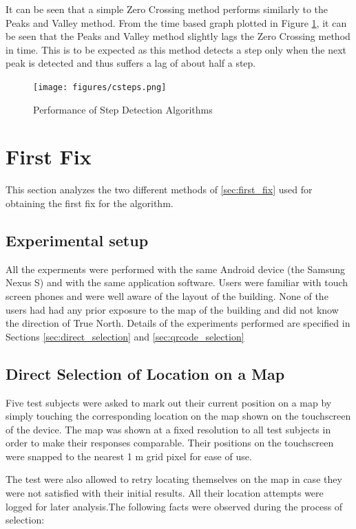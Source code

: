 It can be seen that a simple Zero Crossing method performs similarly to the 
Peaks and Valley method. From the time based graph plotted in 
Figure \ref{fig:csteps}, it can be seen that the Peaks and Valley method 
slightly lags the Zero Crossing method in time. This is to be expected as this
method detects a step only when the next peak is detected and thus suffers a 
lag of about half a step.

\begin{figure}[tbph]
    \centering
    \texttt{[image: figures/csteps.png]}
    \caption{Performance of Step Detection Algorithms\label{fig:csteps}}
\end{figure}


\section{First Fix}

This section analyzes the two different methods of \ref{sec:first_fix}
used for obtaining the first fix for the algorithm. 

\subsection{Experimental setup}

All the experments were performed with the same Android device (the Samsung 
Nexus S) and with the same application software. Users were familiar with 
touch screen phones and were well aware of the layout of the building. None of
the users had had any prior exposure to the map of the building and did not 
know the direction of True North. Details of the experiments performed 
are specified in Sections \ref{sec:direct_selection} and \ref{sec:qrcode_selection}

\subsection{Direct Selection of Location on a Map\label{sec:direct_selection}}

Five test subjects were asked to mark out their current position on a
map by simply touching the corresponding location on the map shown on the 
touchscreen of the device. The map was shown at a fixed resolution to all 
test subjects in order to make their responses comparable. Their positions 
on the touchscreen were snapped to the nearest 1 m grid pixel for ease of use.

The test were also allowed to retry locating themselves on the map in case they
were not satisfied with their initial results. All their location attempts were
logged for later analysis.The following facts were observed during the process of 
selection:

